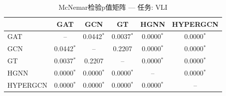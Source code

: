 \begin{table}[htbp]
\centering
\caption{McNemar检验p值矩阵 — 任务: VLI}
\label{tab:mcnemar_VLI}
\begin{tabular}{lccccc}
\toprule
 & GAT & GCN & GT & HGNN & HYPERGCN \\
\midrule
GAT & -- & 0.0442$^*$ & 0.0037$^*$ & 0.0000$^*$ & 0.0000$^*$ \\
GCN & 0.0442$^*$ & -- & 0.2207 & 0.0000$^*$ & 0.0000$^*$ \\
GT & 0.0037$^*$ & 0.2207 & -- & 0.0000$^*$ & 0.0000$^*$ \\
HGNN & 0.0000$^*$ & 0.0000$^*$ & 0.0000$^*$ & -- & 0.0000$^*$ \\
HYPERGCN & 0.0000$^*$ & 0.0000$^*$ & 0.0000$^*$ & 0.0000$^*$ & -- \\
\bottomrule
\end{tabular}
\end{table}
